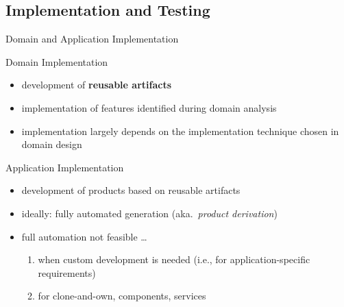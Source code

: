 \subsection{Implementation and Testing}
\begin{frame}{Domain and Application Implementation}
	\begin{fancycolumns}[T,columns=3,widths={10}]
		\renewcommand{\projectcartoonwidth}{1}
	\nextcolumn
		\begin{definition}{Domain Implementation} %
			\begin{itemize}
				\item development of \textbf{reusable artifacts}
				\item implementation of features identified during domain analysis
				\item implementation largely depends on the implementation technique chosen in domain design
			\end{itemize}
		\end{definition}
	\nextcolumn
		\begin{definition}{Application Implementation}
			\begin{itemize}
				\item development of products based on reusable artifacts
				\item ideally: fully automated generation (aka.\ \emph{product derivation})
				\item full automation not feasible \ldots
					\begin{enumerate}
						\item when custom development is needed (i.e., for application-specific requirements)
						\item for clone-and-own, components, services
					\end{enumerate}
			\end{itemize}
		\end{definition}
	\end{fancycolumns}
\end{frame}

